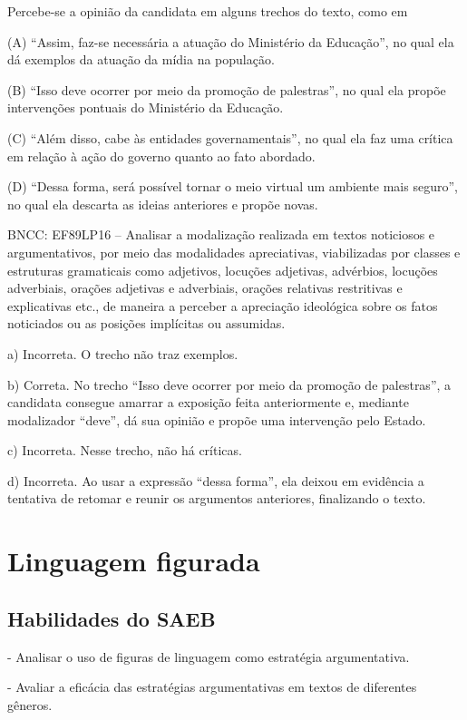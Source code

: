 \begin{itemize}
\begin{itemize}
Percebe-se a opinião da candidata em alguns trechos do texto, como em

(A) ``Assim, faz-se necessária a atuação do Ministério da Educação'', no
qual ela dá exemplos da atuação da mídia na população.

(B) ``Isso deve ocorrer por meio da promoção de palestras'', no qual ela
propõe intervenções pontuais do Ministério da Educação.

(C) ``Além disso, cabe às entidades governamentais'', no qual ela faz
uma crítica em relação à ação do governo quanto ao fato abordado.

(D) ``Dessa forma, será possível tornar o meio virtual um ambiente mais
seguro'', no qual ela descarta as ideias anteriores e propõe novas.

BNCC: EF89LP16 -- Analisar a modalização realizada em textos noticiosos
e argumentativos, por meio das modalidades apreciativas, viabilizadas
por classes e estruturas gramaticais como adjetivos, locuções adjetivas,
advérbios, locuções adverbiais, orações adjetivas e adverbiais, orações
relativas restritivas e explicativas etc., de maneira a perceber a
apreciação ideológica sobre os fatos noticiados ou as posições
implícitas ou assumidas.

a) Incorreta. O trecho não traz exemplos.

b) Correta. No trecho ``Isso deve ocorrer por meio da promoção de
palestras'', a candidata consegue amarrar a exposição feita
anteriormente e, mediante modalizador ``deve'', dá sua opinião e propõe
uma intervenção pelo Estado.

c) Incorreta. Nesse trecho, não há críticas.

d) Incorreta. Ao usar a expressão ``dessa forma'', ela deixou em
evidência a tentativa de retomar e reunir os argumentos anteriores,
finalizando o texto.

\chapter{Linguagem figurada}

\section{Habilidades do SAEB}

- Analisar o uso de figuras de linguagem como estratégia argumentativa.

- Avaliar a eficácia das estratégias argumentativas em textos de
diferentes gêneros.


\end{itemize}
\end{itemize}

